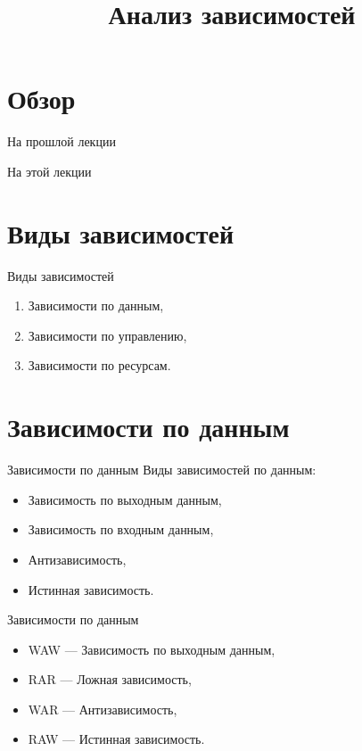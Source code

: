 

\title{Анализ зависимостей}



\begin{frame}
\titlepage
\end{frame}

\section*{Обзор}

\begin{frame}{На прошлой лекции}
\end{frame}

\begin{frame}{На этой лекции}
\tableofcontents
\end{frame} 

\section{Виды зависимостей}

\begin{frame}{Виды зависимостей}
\begin{enumerate}
    \item Зависимости по данным,
    \pause
    \item Зависимости по управлению,
    \pause
    \item Зависимости по ресурсам.
\end{enumerate}
\end{frame}

\section{Зависимости по данным}

\begin{frame}{Зависимости по данным}
Виды зависимостей по данным:

\begin{itemize}
    \item Зависимость по выходным данным,
    \item Зависимость по входным данным,
    \item Антизависимость,
    \item Истинная зависимость.
\end{itemize}
\end{frame}

\begin{frame}{Зависимости по данным}
\begin{itemize}
  \item WAW --- Зависимость по выходным данным,
  \item RAR --- Ложная зависимость,
  \item WAR --- Антизависимость,
  \item RAW --- Истинная зависимость.
\end{itemize}
\end{frame}

